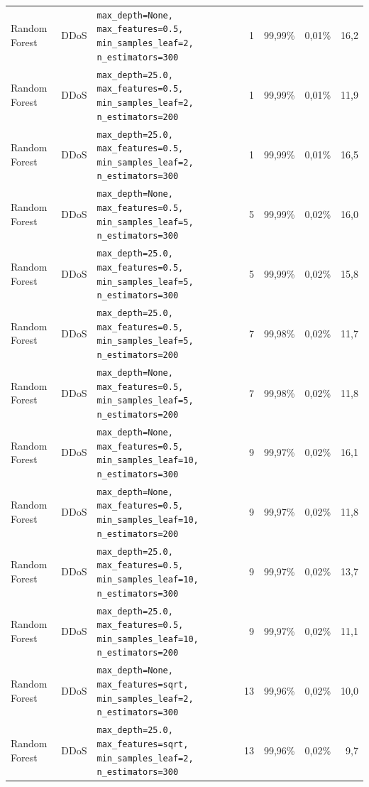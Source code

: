 {{\begin{tabularx}{\textwidth}{@{}llLrrrr@{}}
Random Forest & DDoS & \scriptsize\texttt{max\_depth=None, max\_features=0.5, min\_samples\_leaf=2, n\_estimators=300} & 1 & 99,99\% & 0,01\% & 16,2\\
Random Forest & DDoS & \scriptsize\texttt{max\_depth=25.0, max\_features=0.5, min\_samples\_leaf=2, n\_estimators=200} & 1 & 99,99\% & 0,01\% & 11,9\\
Random Forest & DDoS & \scriptsize\texttt{max\_depth=25.0, max\_features=0.5, min\_samples\_leaf=2, n\_estimators=300} & 1 & 99,99\% & 0,01\% & 16,5\\
Random Forest & DDoS & \scriptsize\texttt{max\_depth=None, max\_features=0.5, min\_samples\_leaf=5, n\_estimators=300} & 5 & 99,99\% & 0,02\% & 16,0\\
Random Forest & DDoS & \scriptsize\texttt{max\_depth=25.0, max\_features=0.5, min\_samples\_leaf=5, n\_estimators=300} & 5 & 99,99\% & 0,02\% & 15,8\\
Random Forest & DDoS & \scriptsize\texttt{max\_depth=25.0, max\_features=0.5, min\_samples\_leaf=5, n\_estimators=200} & 7 & 99,98\% & 0,02\% & 11,7\\
Random Forest & DDoS & \scriptsize\texttt{max\_depth=None, max\_features=0.5, min\_samples\_leaf=5, n\_estimators=200} & 7 & 99,98\% & 0,02\% & 11,8\\
Random Forest & DDoS & \scriptsize\texttt{max\_depth=None, max\_features=0.5, min\_samples\_leaf=10, n\_estimators=300} & 9 & 99,97\% & 0,02\% & 16,1\\
Random Forest & DDoS & \scriptsize\texttt{max\_depth=None, max\_features=0.5, min\_samples\_leaf=10, n\_estimators=200} & 9 & 99,97\% & 0,02\% & 11,8\\
Random Forest & DDoS & \scriptsize\texttt{max\_depth=25.0, max\_features=0.5, min\_samples\_leaf=10, n\_estimators=300} & 9 & 99,97\% & 0,02\% & 13,7\\
Random Forest & DDoS & \scriptsize\texttt{max\_depth=25.0, max\_features=0.5, min\_samples\_leaf=10, n\_estimators=200} & 9 & 99,97\% & 0,02\% & 11,1\\
Random Forest & DDoS & \scriptsize\texttt{max\_depth=None, max\_features=sqrt, min\_samples\_leaf=2, n\_estimators=300} & 13 & 99,96\% & 0,02\% & 10,0\\
Random Forest & DDoS & \scriptsize\texttt{max\_depth=25.0, max\_features=sqrt, min\_samples\_leaf=2, n\_estimators=300} & 13 & 99,96\% & 0,02\% & 9,7\\

\end{tabularx}}}
